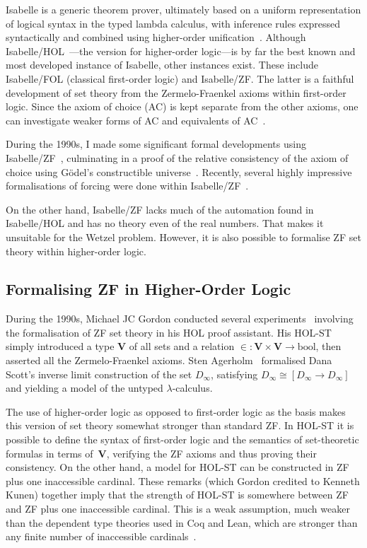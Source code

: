 \documentclass[runningheads]{llncs}
\newcommand{\V}{\mathbf{V}}
\newcommand{\bool}{\mathrm{bool}}
\begin{document}
Isabelle is a generic theorem prover, ultimately based on a uniform representation of logical syntax in the typed lambda calculus, with inference rules expressed syntactically and combined using higher-order unification~\cite{paulson-found}. Although Isabelle/HOL~\cite{isa-tutorial}---the version for higher-order logic---is by far the best known and most developed instance of Isabelle, other instances exist. These include Isabelle/FOL (classical first-order logic) and Isabelle/ZF\@.
The latter is a faithful development of set theory from the Zermelo-Fraenkel axioms within first-order logic.
Since the axiom of choice (AC) is kept separate from the other axioms, one can investigate weaker forms of AC and equivalents of AC~\cite{paulson-gr}. 

During the 1990s, I made some significant formal developments using Isabelle/ZF~\cite{paulson-reflection}, culminating in a proof of the relative consistency of the axiom of choice using Gödel's constructible universe~\cite{paulson-consistency}. Recently, several highly impressive formalisations of forcing were done within Isabelle/ZF~\cite{gunther-forcing,Independence_CH-AFP}.

On the other hand, Isabelle/ZF lacks much of the automation found in Isabelle/HOL and has no theory even of the real numbers.
That makes it unsuitable for the Wetzel problem. However, it is also possible to formalise ZF set theory within higher-order logic.

\subsection{Formalising ZF in Higher-Order Logic}

During the 1990s, Michael JC Gordon conducted several experiments~\cite{gordon-set-theory} involving the formalisation of ZF set theory in his HOL proof assistant. 
His HOL-ST simply introduced a type $\V$ of all sets and a relation ${\in}:\V\times \V\to \bool$, then asserted all the Zermelo-Fraenkel axioms. 
Sten Agerholm~\cite{agerholm-comparison} formalised Dana Scott's inverse limit construction of the set $D_\infty$, satisfying
$D_\infty \cong [D_\infty\to D_\infty]$ and yielding a model of the untyped $\lambda$-calculus.

The use of higher-order logic as opposed to first-order logic as the basis makes this version of set theory somewhat stronger than standard ZF\@. 
In HOL-ST it is possible to define the syntax of first-order logic and the semantics of set-theoretic formulas in terms of~$\V$, verifying the ZF axioms and thus proving their consistency.
On the other hand, a model for HOL-ST can be constructed in ZF plus one inaccessible cardinal. 
These remarks (which Gordon credited to Kenneth Kunen) together imply that 
the strength of HOL-ST is somewhere between ZF and ZF plus one inaccessible cardinal.
This is a weak assumption, much weaker than the dependent type theories used in Coq and Lean, which are stronger than any finite number of inaccessible cardinals~\cite{werner-sets-types}.
\end{document}
